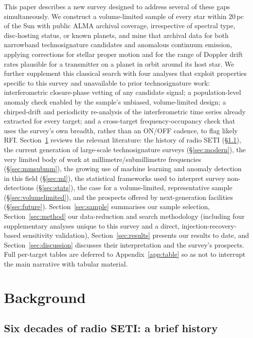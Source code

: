 \documentclass{openjournal}
\begin{document}
This paper describes a new survey designed to address several of these gaps
simultaneously. We construct a volume-limited sample of every star within
20\,pc of the Sun with public ALMA archival coverage, irrespective of
spectral type, disc-hosting status, or known planets, and mine that
archival data for both narrowband technosignature candidates and
anomalous continuum emission, applying corrections for stellar proper
motion and for the range of Doppler drift rates plausible for a
transmitter on a planet in orbit around its host star. We further
supplement this classical search with four analyses that exploit
properties specific to this survey and unavailable to prior
technosignature work: interferometric closure-phase vetting of any
candidate signal; a population-level anomaly check enabled by the
sample's unbiased, volume-limited design; a chirped-drift and
periodicity re-analysis of the interferometric time series already
extracted for every target; and a cross-target frequency-occupancy
check that uses the survey's own breadth, rather than an ON/OFF cadence,
to flag likely RFI.
Section~\ref{sec:background} reviews the relevant
literature: the history of radio SETI (\S\ref{sec:history}), the current
generation of large-scale technosignature surveys (\S\ref{sec:modern}), the very
limited body of work at millimetre/submillimetre frequencies
(\S\ref{sec:mmsubmm}), the growing use of machine learning and anomaly detection
in this field (\S\ref{sec:ml}), the statistical frameworks used to interpret
survey non-detections (\S\ref{sec:stats}), the case for a volume-limited,
representative sample (\S\ref{sec:volumelimited}), and the prospects offered by
next-generation facilities (\S\ref{sec:future}). Section~\ref{sec:sample}
summarises our sample selection, Section~\ref{sec:method} our data-reduction and
search methodology (including four supplementary analyses unique to
this survey and a direct, injection-recovery-based sensitivity
validation), Section~\ref{sec:results} presents our results to date, and
Section~\ref{sec:discussion} discusses their interpretation and the survey's
prospects. Full per-target tables are deferred to Appendix~\ref{app:table}
so as not to interrupt the main narrative with tabular material.

\section{Background}
\label{sec:background}

\subsection{Six decades of radio SETI: a brief history}
\label{sec:history}
\end{document}
